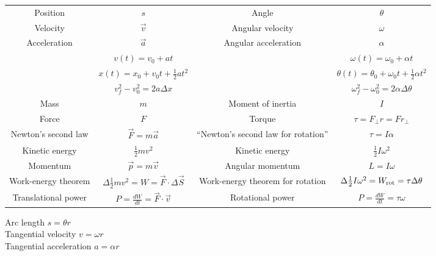 \documentclass[10pt]{article}
\begin{document}
\begin{tabular}{| c | c | c | c |}
	\hline
	Position & $s$ & Angle & $\theta$  \\
	Velocity & $\vec v$ & Angular velocity & $\omega$  \\
	Acceleration & $\vec a$ & Angular acceleration & $\alpha$  \\
	\hline
	& $v(t) = v_0 + at$ & & $\omega(t) = \omega_0 + \alpha t$ \\
	& $x(t) = x_0 + v_0 t + \frac{1}{2} at^2$ & & $\theta(t) = \theta_0 + \omega_0 t + \frac{1}{2} \alpha t^2$ \\
	& $v_f^2 - v_0^2 = 2a \Delta x$ & & $\omega_f^2 - \omega_0^2 = 2 \alpha \Delta \theta$ \\
	\hline
	Mass & $m$ & Moment of inertia & $I$ \\
	\hline
	Force & $F$ & Torque & $\tau = F_\perp r = F r_\perp$ \\
	\hline
	Newton's second law & $\vec F = m \vec a$ & ``Newton's second law for rotation'' & $\tau = I \alpha$ \\
	\hline
	Kinetic energy & $\frac{1}{2} mv^2$ & Kinetic energy & $\frac{1}{2}I\omega^2$ \\
	\hline
	Momentum & $\vec p = m \vec v$ & Angular momentum & $L = I \omega$ \\
	\hline
	Work-energy theorem & $\Delta \frac{1}{2}mv^2 = W = \vec F \cdot \Delta \vec S$ & Work-energy theorem for rotation & $\Delta \frac{1}{2}I\omega^2 = W_{\rm rot} = \tau \Delta \theta$ \\
	\hline
	Translational power & $P = \frac{dW}{dt} = \vec F \cdot \vec v$ & Rotational power & $P = \frac{dW}{dt} = \tau \omega$ \\
	\hline
\end{tabular}

\bigskip
\bigskip
\bigskip

Arc length $s=\theta r$ \\
Tangential velocity $v=\omega r$ \\
Tangential acceleration $a=\alpha r$
\end{document}
